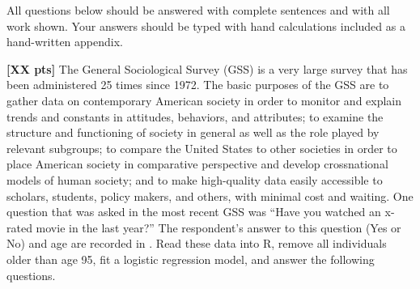 \documentclass[10pt,openany]{book}\usepackage[]{graphicx}\usepackage[]{color}
\begin{document}
\newpage
\begin{hwsection}{All questions below should be answered with complete sentences and with all work shown.  Your answers should be typed with hand calculations included as a hand-written appendix.}

  \item \label{hwprob:LMlogisticGSS} \textbf{[XX pts]}  The General Sociological Survey (GSS) is a very large survey that has been administered 25 times since 1972.  The basic purposes of the GSS are to gather data on contemporary American society in order to monitor and explain trends and constants in attitudes, behaviors, and attributes; to examine the structure and functioning of society in general as well as the role played by relevant subgroups; to compare the United States to other societies in order to place American society in comparative perspective and develop crossnational models of human society; and to make high-quality data easily accessible to scholars, students, policy makers, and others, with minimal cost and waiting.  One question that was asked in the most recent GSS was ``Have you watched an x-rated movie in the last year?''  The respondent's answer to this question (Yes or No) and age are recorded in .  Read these data into R, remove all individuals older than age 95, fit a logistic regression model, and answer the following questions.


\end{hwsection}
\end{document}
